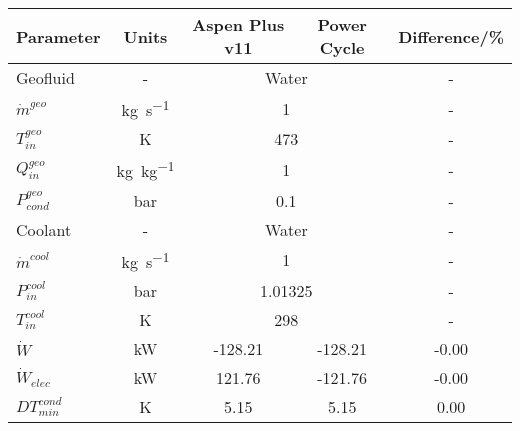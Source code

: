 \begin{tabular}{|p{2.5cm} c c c c|}
    \hline
    \rowcolor{bluepoli!40} %
    \textbf{Parameter} & \textbf{Units} & \textbf{Aspen Plus v11} & \textbf{Power Cycle} & \textbf{Difference/\unit{\percent}} \T\B \\
    \hline \hline
    Geofluid & - & \multicolumn{2}{c}{Water} & - \T\B\\
    \(\Dot{m}^{geo}\)  & \unit{\kg\per\s} & \multicolumn{2}{c}{\num{1}} & - \T\B\\
    \(T_{in}^{geo}\) & \unit{\K} & \multicolumn{2}{c}{\num{473}} & - \T\B\\
    \(Q_{in}^{geo}\) & \unit{\kg\per\kg} & \multicolumn{2}{c}{\num{1}} & - \T\B\\
    \(P_{cond}^{geo}\) & \unit{\bar} & \multicolumn{2}{c}{\num{0.1}} & - \T\B\\
    \hline
    Coolant & - & \multicolumn{2}{c}{Water} & - \T\B\\
    \(\Dot{m}^{cool}\)  & \unit{\kg\per\s} & \multicolumn{2}{c}{\num{1}} & - \T\B\\
    \(P_{in}^{cool}\) & \unit{\bar} & \multicolumn{2}{c}{\num{1.01325}} & - \T\B\\
    \(T_{in}^{cool}\) & \unit{\K} & \multicolumn{2}{c}{\num{298}} & - \T\B\\
    \hline\hline
    \(\Dot{W}\) & \unit{\kilo\watt} & -128.21 & -128.21 & -0.00 \T\B\\
    \(\Dot{W}_{elec}\) & \unit{\kilo\watt} & 121.76 & -121.76 & -0.00 \T\B\\
    \(DT_{min}^{cond}\) & \unit{\K} & 5.15 & 5.15 & 0.00 \T\B\\
    \hline
\end{tabular}
